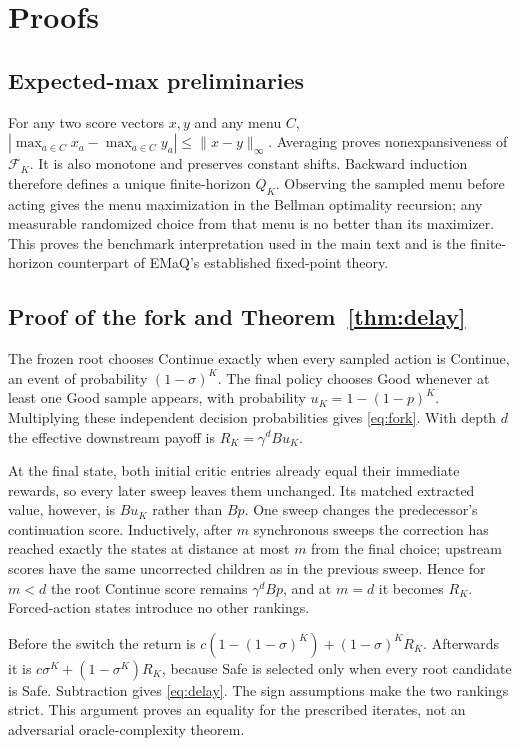 \documentclass[11pt]{article}
\newcommand{\cF}{\mathcal F}\newcommand{\cC}{\mathcal C}
\begin{document}


\clearpage
\appendix
\section{Proofs}
\subsection{Expected-max preliminaries}
For any two score vectors $x,y$ and any menu $C$,
$|\max_{a\in C}x_a-\max_{a\in C}y_a|\le\|x-y\|_\infty$.
Averaging proves nonexpansiveness of $\cF_K$. It is also monotone and preserves constant shifts. Backward induction therefore defines a unique finite-horizon $Q_K$. Observing the sampled menu before acting gives the menu maximization in the Bellman optimality recursion; any measurable randomized choice from that menu is no better than its maximizer. This proves the benchmark interpretation used in the main text and is the finite-horizon counterpart of EMaQ's established fixed-point theory.

\subsection{Proof of the fork and Theorem~\ref{thm:delay}}
The frozen root chooses Continue exactly when every sampled action is Continue, an event of probability $(1-\sigma)^K$. The final policy chooses Good whenever at least one Good sample appears, with probability $u_K=1-(1-p)^K$. Multiplying these independent decision probabilities gives \eqref{eq:fork}. With depth $d$ the effective downstream payoff is $R_K=\gamma^dBu_K$.

At the final state, both initial critic entries already equal their immediate rewards, so every later sweep leaves them unchanged. Its matched extracted value, however, is $Bu_K$ rather than $Bp$. One sweep changes the predecessor's continuation score. Inductively, after $m$ synchronous sweeps the correction has reached exactly the states at distance at most $m$ from the final choice; upstream scores have the same uncorrected children as in the previous sweep. Hence for $m<d$ the root Continue score remains $\gamma^dBp$, and at $m=d$ it becomes $R_K$. Forced-action states introduce no other rankings.

Before the switch the return is $c(1-(1-\sigma)^K)+(1-\sigma)^KR_K$. Afterwards it is $c\sigma^K+(1-\sigma^K)R_K$, because Safe is selected only when every root candidate is Safe. Subtraction gives \eqref{eq:delay}. The sign assumptions make the two rankings strict. This argument proves an equality for the prescribed iterates, not an adversarial oracle-complexity theorem.
\end{document}
